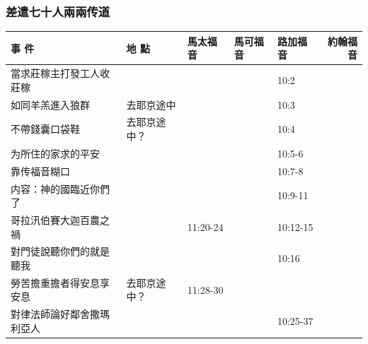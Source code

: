 \subsubsection{差遣七十人兩兩传道}

\begin{table}[H] \centering 
\begin{tabular}{p{13.07em}|l|l|l|p{5.285em}|r} \toprule
\textbf{事 件} & \multicolumn{1}{p{7.93em}|}{\textbf{地 點}} & \multicolumn{1}{p{5.285em}|}{\textbf{馬太福音}} & \multicolumn{1}{p{5.57em}|}{\textbf{馬可福音}} & \textbf{路加福音} & \multicolumn{1}{p{4.855em}}{\textbf{約翰福音}} \\\midrule 



當求莊稼主打發工人收莊稼& \multicolumn{1}{p{7.93em}|}{} & \multicolumn{1}{p{5.285em}|}{} &       & 10:2&  \\\midrule

如同羊羔進入狼群& \multicolumn{1}{p{7.93em}|}{去耶京途中} & \multicolumn{1}{p{5.285em}|}{} &       & 10:3&  \\\midrule
不帶錢囊口袋鞋& \multicolumn{1}{p{7.93em}|}{去耶京途中？} & \multicolumn{1}{p{5.285em}|}{} &       & 10:4&  \\\midrule
为所住的家求的平安& \multicolumn{1}{p{7.93em}|}{} & \multicolumn{1}{p{5.285em}|}{} &       & 10:5-6&  \\\midrule

靠传福音糊口& \multicolumn{1}{p{7.93em}|}{} & \multicolumn{1}{p{5.285em}|}{} &       & 10:7-8&  \\\midrule
内容：神的國臨近你們了& \multicolumn{1}{p{7.93em}|}{} & \multicolumn{1}{p{5.285em}|}{} &       & 10:9-11&  \\\midrule
哥拉汛伯賽大迦百農之禍& \multicolumn{1}{p{7.93em}|}{} & \multicolumn{1}{p{5.285em}|}{11:20-24} &       & 10:12-15&  \\\midrule
對門徒說聽你們的就是聽我& \multicolumn{1}{p{7.93em}|}{} & \multicolumn{1}{p{5.285em}|}{} &       & 10:16&  \\\midrule


勞苦擔重擔者得安息享安息& \multicolumn{1}{p{7.93em}|}{去耶京途中？} & \multicolumn{1}{p{5.285em}|}{11:28-30} &       &  &  \\ \midrule

對律法師論好鄰舍撒瑪利亞人&       &       &       & 10:25-37 &  \\ \midrule
\end{tabular}%
\end{table}%




